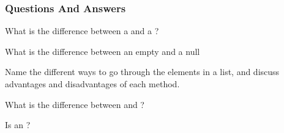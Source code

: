 \begin{slide}[fragile]
  \frametitle{Questions And Answers}
  \begin{questionize}
  \item What is the difference between a  and a ?
  \item What is the difference between an empty  and a null 
  \item Name the different ways to go through the elements in a list, and discuss
    advantages and disadvantages of each method.
  \item What is the difference between  and ?
  \item Is  an ?
 \end{questionize}
\end{slide}
